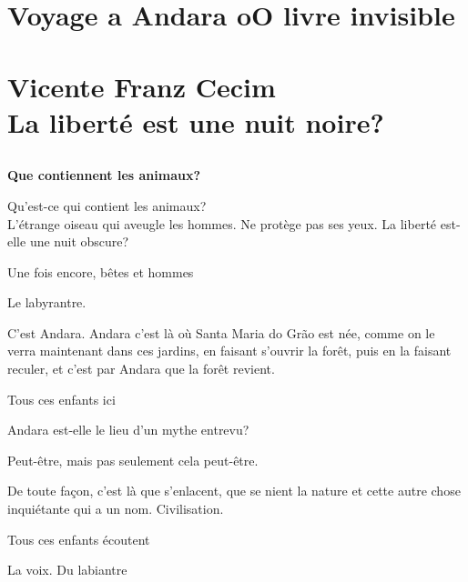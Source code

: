 \clearpage{\pagestyle{empty}\cleardoublepage}
\movetooddpage
\part*{Voyage a Andara oO livre invisible\\
\bigskip
\bigskip
\bigskip
\bigskip
{}\\
\Large{Vicente Franz Cecim}\\
\bigskip
\bigskip
\normalsize{La liberté est une nuit noire?}}

\chapter*{}



\forceindent{}\textbf{Que contiennent les animaux?}

Qu'est-ce qui contient les animaux?\\

L'étrange oiseau qui aveugle les hommes. Ne protège pas ses yeux. La
liberté est-elle une nuit obscure?

Une fois encore, bêtes et hommes

\pagebreak

\vspace*{4cm}

Le labyrantre.

C'est Andara. Andara c'est là où Santa Maria do Grão est née, comme on
le verra maintenant dans ces jardins, en faisant s'ouvrir la forêt, puis
en la faisant reculer, et c'est par Andara que la forêt revient.

Tous ces enfants ici

Andara est-elle le lieu d'un mythe entrevu?

Peut-être, mais pas seulement cela peut-être.

De toute façon, c'est là que s'enlacent, que se nient la nature et cette
autre chose inquiétante qui a un nom. Civilisation.

Tous ces enfants écoutent

La voix. Du labiantre

\pagebreak

\vspace*{4cm}

